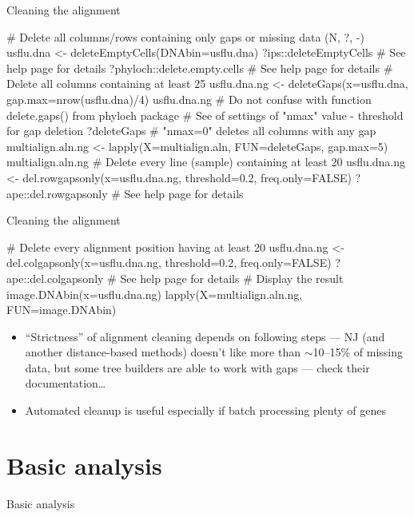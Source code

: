 \documentclass[compress, ucs, xelatex, 11pt, xcolor=svgnames, aspectratio=169,
	hyperref={
		bookmarks=true,
		unicode=true,
		colorlinks=true,
		pdftitle={Molecular data in R},
		plainpages=false,
		pdfauthor={Vojtech Zeisek},
		pdfsubject={Course about phylogeny and evolution in R},
		pdfcreator={XeLaTeX},
		pdfkeywords={R, evolution, phylogeny, molecular data},
		linkcolor=Crimson, %
		anchorcolor=Magenta, %
		citecolor=Magenta, %
		filecolor=Magenta, %
		menucolor=Magenta, %
		urlcolor=DodgerBlue, %
		pdftex},
	url={hyphens, lowtilde} %
	]{beamer}
\begin{document}
\begin{frame}[fragile]{Cleaning the alignment}
	\begin{spluscode}
    # Delete all columns/rows containing only gaps or missing data (N, ?, -)
    usflu.dna <- deleteEmptyCells(DNAbin=usflu.dna)
    ?ips::deleteEmptyCells # See help page for details
    ?phyloch::delete.empty.cells # See help page for details
    # Delete all columns containing at least 25%
    usflu.dna.ng <- deleteGaps(x=usflu.dna, gap.max=nrow(usflu.dna)/4)
    usflu.dna.ng
    # Do not confuse with function delete.gaps() from phyloch package
    # See of settings of "nmax" value - threshold for gap deletion
    ?deleteGaps # "nmax=0" deletes all columns with any gap
    multialign.aln.ng <- lapply(X=multialign.aln, FUN=deleteGaps, gap.max=5)
    multialign.aln.ng
    # Delete every line (sample) containing at least 20%
    usflu.dna.ng <- del.rowgapsonly(x=usflu.dna.ng, threshold=0.2,
      freq.only=FALSE)
    ?ape::del.rowgapsonly # See help page for details
	\end{spluscode}
\end{frame}

\begin{frame}[fragile]{Cleaning the alignment}
	\begin{spluscode}
    # Delete every alignment position having at least 20%
    usflu.dna.ng <- del.colgapsonly(x=usflu.dna.ng, threshold=0.2,
      freq.only=FALSE)
    ?ape::del.colgapsonly # See help page for details
    # Display the result
    image.DNAbin(x=usflu.dna.ng)
    lapply(X=multialign.aln.ng, FUN=image.DNAbin)
	\end{spluscode}
	\begin{itemize}
		\item \enquote{Strictness} of alignment cleaning depends on following steps --- NJ (and another distance-based methods) doesn't like more than $\sim$10--15\% of missing data, but some tree builders are able to work with gaps --- check their documentation\ldots
		\item Automated cleanup is useful especially if batch processing plenty of genes
	\end{itemize}
\end{frame}

\section{Basic analysis}

\begin{frame}{Basic analysis}
	\tableofcontents[currentsection, sectionstyle=show/hide, hideothersubsections]
\end{frame}
\end{document}
